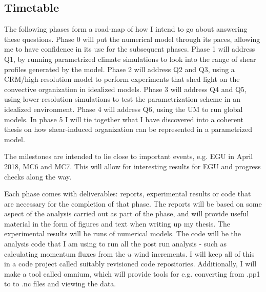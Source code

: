 \documentclass[11pt,a4paper]{article}
\begin{document}
\subsection*{Timetable}

\begin{figure}[hbp!]
    
\end{figure}

The following phases form a road-map of how I intend to go about answering these questions. Phase 0 will put the numerical model through its paces, allowing me to have confidence in its use for the subsequent phases. Phase 1 will address Q1, by running parametrized climate simulations to look into the range of shear profiles generated by the model. Phase 2 will address Q2 and Q3, using a CRM/high-resolution model to perform experiments that shed light on the convective organization in idealized models. Phase 3 will address Q4 and Q5, using lower-resolution simulations to test the parametrization scheme in an idealized environment. Phase 4 will address Q6, using the UM to run global models. In phase 5 I will tie together what I have discovered into a coherent thesis on how shear-induced organization can be represented in a parametrized model.

The milestones are intended to lie close to important events, e.g. EGU in April 2018, MC6 and MC7. This will allow for interesting results for EGU and progress checks along the way.

Each phase comes with deliverables: reports, experimental results or code that are necessary for the completion of that phase. The reports will be based on some aspect of the analysis carried out as part of the phase, and will provide useful material in the form of figures and text when writing up my thesis. The experimental results will be runs of numerical models. The code will be the analysis code that I am using to run all the post run analysis - such as calculating momentum fluxes from the $u$ wind increments. I will keep all of this in a code project called suitably revisioned code repositories. Additionally, I will make a tool called omnium, which will provide tools for e.g. converting from .pp1 to to .nc files and viewing the data.
\end{document}

